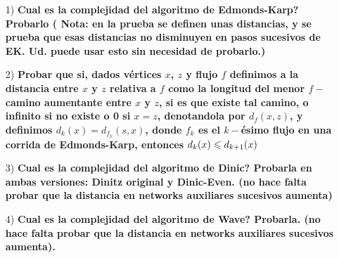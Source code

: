 \documentclass[12pt,a4paper]{article}
\begin{document}
\maketitle{}

\begin{itemize}
    \item [1)] \textbf{Cual es la complejidad del algoritmo de Edmonds-Karp? Probarlo (
        Nota: en la prueba se definen unas distancias, y se prueba que esas 
        distancias no disminuyen en pasos sucesivos de EK. Ud. puede usar esto 
        sin necesidad de probarlo.)}
        \label{dem:EK}
\end{itemize}

\begin{itemize}
    \item [2)] \textbf{Probar que si, dados vértices $x$, $z$ y flujo $f$ definimos a la distancia 
    entre $x$ y $z$ relativa a $f$ como la longitud del menor $f-$camino aumentante 
    entre $x$ y $z$, si es que existe tal camino, o infinito si no existe o 0 
    si $x = z$, denotandola por $d_{f} (x, z)$, y definimos 
    $d_{k}(x) = d_{f_{k}} (s, x)$, donde $f_{k}$ es el $k-$ésimo flujo en una 
    corrida de Edmonds-Karp, entonces $d_{k}(x) \leqslant d_{k+1}(x)$}
    \label{dem:dist}
\end{itemize}

\begin{itemize}
    \item [3)] \textbf{Cual es la complejidad del algoritmo de Dinic? Probarla en ambas 
    versiones: Dinitz original y Dinic-Even. (no hace falta probar que la distancia 
    en networks auxiliares sucesivos aumenta)}
    \label{dem:Dinic}
\end{itemize}

\begin{itemize}
    \item [4)] \textbf{Cual es la complejidad del algoritmo de Wave? Probarla. (no hace falta 
    probar que la distancia en networks auxiliares sucesivos aumenta).}
    \label{dem:Wave}
\end{itemize}
\end{document}
